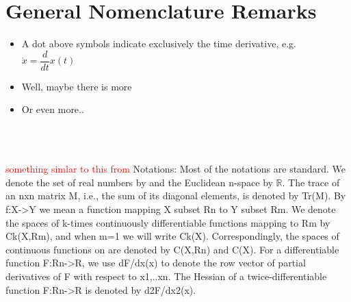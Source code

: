 \section*{General Nomenclature Remarks}
\vspace{0.1cm}
\begin{itemize}
\item A dot above symbols indicate exclusively the time derivative, e.g. $\dot{x} = \dfrac{d}{dt}x(t)$
\item Well, maybe there is more
\item Or even more..
\end{itemize}

\textcolor{white}{\gls{analytic_func} \gls{rational_func} \gls{proper_func} \gls{injective_func} \gls{surjective_func} \gls{bijective_func} \gls{lipschitz} \gls{compact_space} \gls{hurwitz} \gls{dimension} \gls{extrinsic} \gls{intrinsic}}

\vspace{-16mm}
\textcolor{red}{something simlar to this from \citep{bib:barrier_prajna}}
Notations: Most of the notations are standard. We denote
the set of real numbers by and the Euclidean n-space by $\mathbb{R}$.
The trace of an nxn matrix M, i.e., the sum of its diagonal elements,
is denoted by Tr(M). By f:X->Y we mean a function
mapping X subset Rn to Y subset Rm. We denote the spaces of
k-times continuously differentiable functions mapping
to Rm by Ck(X,Rm), and when m=1 we will write Ck(X).
Correspondingly, the spaces of continuous functions on are
denoted by C(X,Rn) and C(X). For a differentiable function
F:Rn->R, we use dF/dx(x) to denote the row vector
of partial derivatives of F with respect to x1,..xn. The Hessian
of a twice-differentiable function F:Rn->R is denoted
by d2F/dx2(x).
